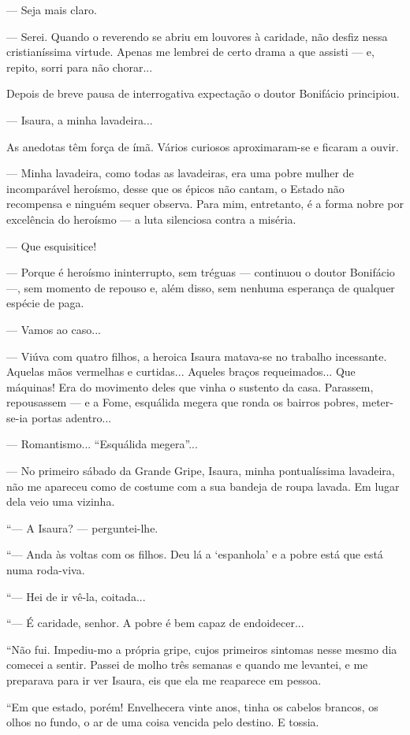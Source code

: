 --- Seja mais claro.

--- Serei. Quando o reverendo se abriu em louvores à caridade, não
desfiz nessa cristianíssima virtude. Apenas me lembrei de certo drama a
que assisti --- e, repito, sorri para não chorar...

Depois de breve pausa de interrogativa expectação o doutor Bonifácio
principiou.

--- Isaura, a minha lavadeira...

As anedotas têm força de ímã. Vários curiosos aproximaram-se e ficaram a
ouvir.

--- Minha lavadeira, como todas as lavadeiras, era uma pobre mulher de
incomparável heroísmo, desse que os épicos não cantam, o Estado não
recompensa e ninguém sequer observa. Para mim, entretanto, é a forma
nobre por excelência do heroísmo --- a luta silenciosa contra a miséria.

--- Que esquisitice!

--- Porque é heroísmo ininterrupto, sem tréguas --- continuou o doutor
Bonifácio ---, sem momento de repouso e, além disso, sem nenhuma
esperança de qualquer espécie de paga.

--- Vamos ao caso...

--- Viúva com quatro filhos, a heroica Isaura matava-se no trabalho
incessante. Aquelas mãos vermelhas e curtidas... Aqueles braços
requeimados... Que máquinas! Era do movimento deles que vinha o sustento
da casa. Parassem, repousassem --- e a Fome, esquálida megera que ronda
os bairros pobres, meter-se-ia portas adentro...

--- Romantismo... ``Esquálida megera''...

--- No primeiro sábado da Grande Gripe, Isaura, minha pontualíssima
lavadeira, não me apareceu como de costume com a sua bandeja de roupa
lavada. Em lugar dela veio uma vizinha.

``--- A Isaura? --- perguntei-lhe.

``--- Anda às voltas com os filhos. Deu lá a `espanhola' e a pobre está
que está numa roda-viva.

``--- Hei de ir vê-la, coitada...

``--- É caridade, senhor. A pobre é bem capaz de endoidecer...

``Não fui. Impediu-mo a própria gripe, cujos primeiros sintomas nesse
mesmo dia comecei a sentir. Passei de molho três semanas e quando me
levantei, e me preparava para ir ver Isaura, eis que ela me reaparece em
pessoa.

``Em que estado, porém! Envelhecera vinte anos, tinha os cabelos
brancos, os olhos no fundo, o ar de uma coisa vencida pelo destino. E
tossia.

